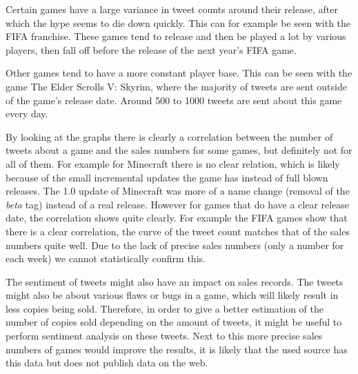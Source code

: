 Certain games have a large variance in tweet counts around their release, after which the hype seems to die down quickly. This can for example be seen with the FIFA franchise. These games tend to release and then be played a lot by various players, then fall off before the release of the next year's FIFA game. 

Other games tend to have a more constant player base. This can be seen with the game The Elder Scrolls V: Skyrim, where the majority of tweets are sent outside of the game's release date. Around 500 to 1000 tweets are sent about this game every day.

By looking at the graphs there is clearly a correlation between the number of tweets about a game and the sales numbers for some games, but definitely not for all of them. For example for Minecraft there is no clear relation, which is likely because of the small incremental updates the game has instead of full blown releases. The 1.0 update of Minecraft was more of a name change (removal of the \emph{beta} tag) instead of a real release. However for games that do have a clear release date, the correlation shows quite clearly. For example the FIFA games show that there is a clear correlation, the curve of the tweet count matches that of the sales numbers quite well. Due to the lack of precise sales numbers (only a number for each week) we cannot statistically confirm this.

The sentiment of tweets might also have an impact on sales records. The tweets might also be about various flaws or bugs in a game, which will likely result in less copies being sold. Therefore, in order to give a better estimation of the number of copies sold depending on the amount of tweets, it might be useful to perform sentiment analysis on these tweets. Next to this more precise sales numbers of games would improve the results, it is likely that the used source has this data but does not publish data on the web.